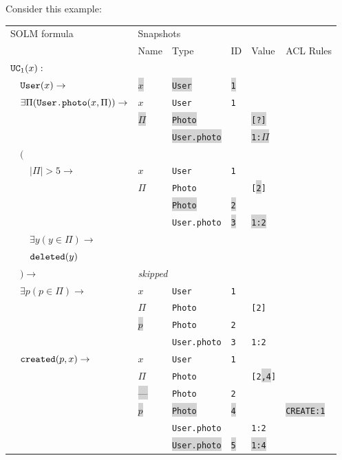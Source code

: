 \documentclass[12pt,oneside,letterpaper]{article}
\begin{document}
    Consider this example:

    \def\chng#1{\colorbox{lightgray}{#1}}
    \begin{tabular}[t]{l|lllll}
        SOLM formula & \multicolumn{5}{l}{Snapshots} \\
        & Name & Type & ID & Value & ACL Rules \\
        \hline

        $\mbox{\texttt{UC}}_1(x) : $ \\
        $\quad \mbox{\texttt{User}}(x) \to$
            & \chng{$x$} & \chng{\texttt{User}} & \chng{\texttt{1}} \\

        \hline
        $\quad \exists \Pi(\mbox{\texttt{User.photo}}(x, \Pi)) \to$
            & $x$ & \texttt{User} & \texttt{1} \\
            & \chng{$\Pi$} & \chng{\texttt{Photo}} & & \chng{\texttt{[?]}} \\
            &  & \chng{\texttt{User.photo}} & & \chng{\texttt{1:$\Pi$}} \\

        \hline
        $\quad ($ \\
        $\quad\quad |\Pi| > 5 \to$
            & $x$ & \texttt{User} & \texttt{1} \\
            & $\Pi$ & \texttt{Photo} & & \texttt{[\chng{2}]} \\
            &  & \chng{\texttt{Photo}} & \chng{\texttt{2}} \\
            & & \texttt{User.photo} & \texttt{\chng{3}} & \chng{\texttt{1:2}} \\

        \hline
        $\quad\quad \exists y(y \in \Pi) \to$ \\
        $\quad\quad \mbox{\texttt{deleted}}(y) $ \\
        $\quad ) \to$
            & \multicolumn{4}{l}{\textit{skipped}} \\

        \hline
        $\quad \exists p(p \in \Pi) \to$
            & $x$ & \texttt{User} & \texttt{1} \\
            & $\Pi$ & \texttt{Photo} & & \texttt{[2]} \\
            & \chng{$p$} & \texttt{Photo} & \texttt{2} \\
            &  & \texttt{User.photo} & \texttt{3} & \texttt{1:2} \\

        \hline
        $\quad \mbox{\texttt{created}}(p, x) \to$
            & $x$ & \texttt{User} & \texttt{1} \\
            & $\Pi$ & \texttt{Photo} & & \texttt{[2\chng{,4}]} \\
            & \chng{---} & \texttt{Photo} & \texttt{2} \\
            & \chng{$p$} & \chng{\texttt{Photo}} & \chng{\texttt{4}} & & \chng{\texttt{CREATE:1}} \\
            & & \texttt{User.photo} & & \texttt{1:2} \\
            & & \chng{\texttt{User.photo}} & \chng{\texttt{5}} & \chng{\texttt{1:4}} \\


\end{tabular}
\end{document}
